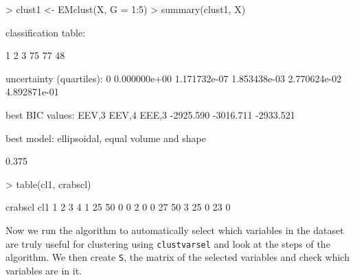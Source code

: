 \documentclass[,12pt]{article}
\newcommand{\Robject}[1]{{\texttt{#1}}}
\newcommand{\Rfunction}[1]{{\texttt{#1}}}
\begin{document}
\begin{Schunk}
\begin{Sinput}
> clust1 <- EMclust(X, G = 1:5)
> summary(clust1, X)
\end{Sinput}
\begin{Soutput}
classification table:

 1  2  3 
75 77 48 

uncertainty (quartiles):
          0%
0.000000e+00 1.171732e-07 1.853438e-03 2.770624e-02 4.892871e-01 

best BIC values:
    EEV,3     EEV,4     EEE,3 
-2925.590 -3016.711 -2933.521 

best model: ellipsoidal, equal volume and shape 
\end{Soutput}
\begin{Soutput}
[1] 0.375
\end{Soutput}
\begin{Sinput}
> table(cl1, crabscl)
\end{Sinput}
\begin{Soutput}
   crabscl
cl1  1  2  3  4
  1 25 50  0  0
  2  0  0 27 50
  3 25  0 23  0
\end{Soutput}
\end{Schunk}
Now we run the algorithm to automatically select which variables in the dataset are truly useful for clustering using \Rfunction{clustvarsel} and look at the steps of the algorithm. We then create \Robject{S}, the matrix of the selected variables and check which variables are in it.
\end{document}
